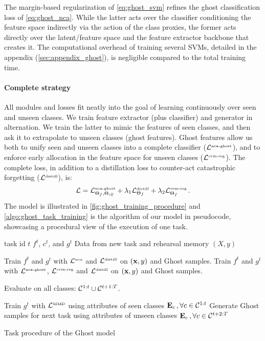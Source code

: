 The margin-based regularization of \autoref{eq:ghost_svm} refines the ghost classification loss of
\autoref{eq:ghost_nca}. While the latter acts over the classifier conditioning the feature space
indirectly via the action of the class proxies, the former acts directly over the latent/feature
space and the feature extractor backbone that creates it. The computational overhead of training
several SVMs, detailed in the appendix (\autoref{sec:appendix_ghost}), is negligible compared to the
total training time.

\paragraph{Complete strategy} All modules and losses fit neatly into the goal of learning
continuously over seen and unseen classes. We train feature extractor (plus classifier) and
generator in alternation. We train the latter to mimic the features of seen classes, and then ask it
to extrapolate to unseen classes (ghost features). Ghost features allow us both to unify seen and
unseen classes into a complete classifier ($\mathcal{L}^\text{\tiny{nca-ghost}}$), and to enforce early
allocation in the feature space for unseen classes ($\mathcal{L}^\text{\tiny{svm-reg}}$). The complete
loss, in addition to a distillation loss to counter-act catastrophic forgetting
($\mathcal{L}^\text{\tiny{distill}}$), is:
%
\begin{equation}
    \mathcal{L} = \mathcal{L}^\text{\tiny{nca-ghost}}_{\Theta_f,\Theta_{\textit{clf}}} + \lambda_1 \mathcal{L}^\text{\tiny{distill}}_{\Theta_f} + \lambda_2 \mathcal{L}^\text{\tiny{svm-reg}}_{\Theta_f}\,.
    \label{eq:ghost_loss}
\end{equation}
%
The model is illustrated in \autoref{fig:ghost_training_procedure} and
\autoref{algo:ghost_task_training} is the algorithm of our model in pseudocode, showcasing a
procedural view of the execution of one task.

\begin{algorithm}[H]
    \begin{algorithmic}[1]
        \Require \Statex task id $t$ \Statex $f^t$, $c^t$, and $g^t$ \Statex Data from new task and
        rehearsal memory $(X, y)$

         \State Train $f^t$ and $g^t$ with $\mathcal{L}^\text{\tiny{nca}}$ and
        $\mathcal{L}^\text{\tiny{distill}}$ on $(\mathbf{x}, y)$ and Ghost samples. \Else \State Train $f^t$ and
        $g^t$ with $\mathcal{L}^\text{\tiny{nca-ghost}}$, $\mathcal{L}^\text{\tiny{svm-reg}}$ and
        $\mathcal{L}^\text{\tiny{distill}}$ on $(\mathbf{x}, y)$ and Ghost samples. \EndIf

        \State Evaluate on all classes: $\mathcal{C}^{1:t} \cup \mathcal{C}^{t+1:T}$.

         \State Train $g^t$ with $\mathcal{L}^\text{\tiny{MMD}}$ using
        attributes of seen classes $\mathbf{E}_{c} \,, \forall c \in \mathcal{C}^{1:t}$ \State Generate
        Ghost samples for next task using attributes of unseen classes $\mathbf{E}_{c} \,, \forall c
            \in \mathcal{C}^{t+2:T}$ \EndIf
    \end{algorithmic}
    \caption{Task procedure of the Ghost model}
    \label{algo:ghost_task_training}
\end{algorithm}


